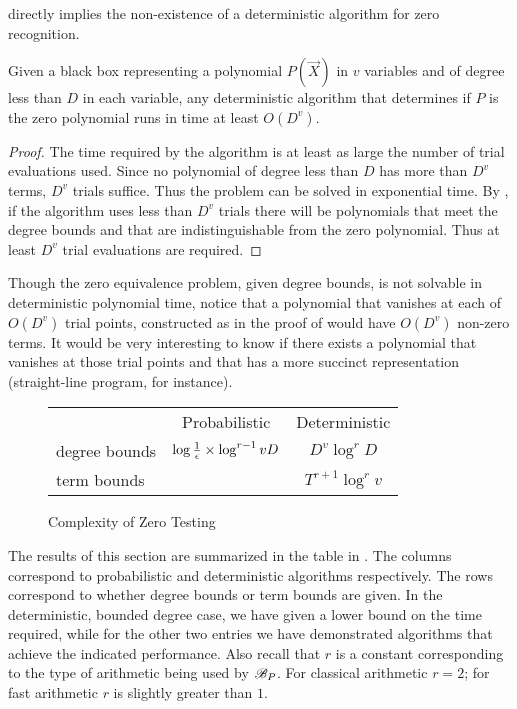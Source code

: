  directly implies the non-existence of a
deterministic algorithm for zero recognition.

\begin{proposition}
\label{Black:Box:Prop}
Given a black box representing a polynomial $P(\vec{X})$ in $v$ variables
and of degree less than $D$ in each variable, any deterministic algorithm
that determines if $P$ is the zero polynomial runs in time at least
$O(D^v)$.
\end{proposition}

\begin{proof}
The time required by the algorithm is at least as large the number of
trial evaluations used.  Since no polynomial of degree less than $D$
has more than $D^v$ terms, $D^v$ trials suffice.  Thus the problem can
be solved in exponential time.  By , if the
algorithm uses less than $D^v$ trials there will be polynomials that
meet the degree bounds and that are indistinguishable from the zero
polynomial.  Thus at least $D^v$ trial evaluations are required.
\end{proof}

Though the zero equivalence problem, given degree bounds, is not solvable
in deterministic polynomial time, notice that a polynomial that vanishes at
each of $O(D^v)$ trial points, constructed as in the proof of
 would have $O(D^v)$ non-zero terms.  It would be
very interesting to know if there exists a polynomial that vanishes at
those trial points and that has a more succinct representation
(straight-line program, for instance).

\begin{figure}
{
\renewcommand{\arraystretch}{1.4}
\begin{center}
\begin{tabular}{l|c|c|}
\multicolumn{1}{c}{} & \multicolumn{1}{c}{Probabilistic}
   & \multicolumn{1}{c}{Deterministic}\\ 
\cline{2-3}
degree bounds & $\log {1 \over \epsilon} \times \log^{r-1} vD$ 
   & $D^v \log^r D$ \\ \cline{2-3}
term bounds & & $T^{r+1} \log^r v$ \\ \cline{2-3}
\end{tabular}
\end{center}
}
\caption{Complexity of Zero Testing\label{Zero:Comp:Fig}}
\end{figure}

The results of this section are summarized in the table in
.  The columns correspond to probabilistic and
deterministic algorithms respectively.  The rows correspond to whether
degree bounds or term bounds are given.  In the deterministic, bounded
degree case, we have given a lower bound on the time required, while
for the other two entries we have demonstrated algorithms that achieve
the indicated performance.  Also recall that $r$ is a constant
corresponding to the type of arithmetic being used by ${\cal B}_P$.
For classical arithmetic $r=2$; for fast arithmetic $r$ is slightly
greater than $1$.

